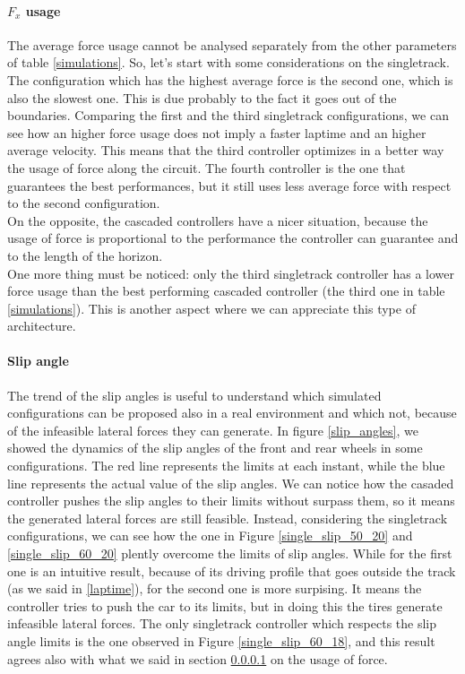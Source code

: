 \documentclass[a4paper, onecolumn, 12pt]{article}
\begin{document}
\paragraph{$F_x$ usage } \label{force_usage}
The average force usage cannot be analysed separately from the other parameters
of table \ref{simulations}. So, let's start with some considerations on the singletrack. \\
The configuration which has the highest average force is the second one, which is 
also the slowest one. This is due probably to the fact it goes out of the boundaries.
Comparing the first and the third singletrack configurations, we can see how an higher
force usage does not imply a faster laptime and an higher average velocity. This means
that the third controller optimizes in a better way the usage of force along the circuit.
The fourth controller is the one that guarantees the best performances, but it still uses
less average force with respect to the second configuration. \\
On the opposite, the cascaded controllers have a nicer situation, because the usage of 
force is proportional to the performance the controller can guarantee and to the length
of the horizon. \\
One more thing must be noticed: only the third singletrack controller has a lower force usage
than the best performing cascaded controller (the third one in table \ref{simulations}).
This is another aspect where we can appreciate this type of architecture.

\paragraph{Slip angle}
The trend of the slip angles is useful to understand which simulated configurations can be
proposed also in a real environment and which not, because of the infeasible lateral forces
they can generate. In figure \ref{slip_angles}, we showed the dynamics of the slip angles of 
the front and rear wheels in some configurations. The red line represents the limits at
each instant, while the blue line represents the actual value of the slip angles. 
We can notice how the casaded controller pushes the slip angles to their limits
without surpass them, so it means the generated lateral forces are still feasible.
Instead, considering the singletrack configurations, we can see how the one in Figure
\ref{single_slip_50_20} and \ref{single_slip_60_20} plently overcome the limits of slip angles.
While for the first one is an intuitive result, because of its driving profile that goes outside
the track (as we said in \ref{laptime}), for the second one is more surpising. It means the 
controller tries to push the car to its limits, but in doing this the tires generate infeasible
lateral forces. The only singletrack controller which respects the slip angle limits is the
one observed in Figure \ref{single_slip_60_18}, and this result agrees also with what we said 
in section \ref{force_usage} on the usage of force.
\end{document}
